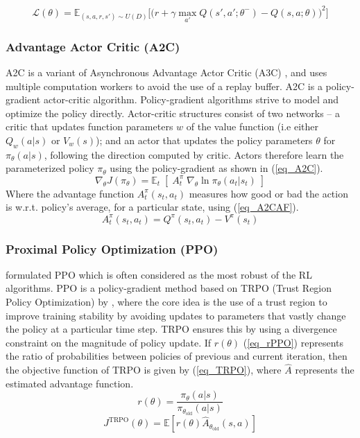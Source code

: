 \documentclass[referee, sn-mathphys-num]{sn-jnl}
\begin{document}
	\begin{equation}\label{eq_DQN}
		\mathcal{L}(\theta) = \mathbb{E}_{(s, a, r, s') \sim U(D)} \Big[ \big( r + \gamma \max_{a'} Q(s', a'; \theta^{-}) - Q(s, a; \theta) \big)^2 \Big]
	\end{equation}
	
	\subsubsection*{Advantage Actor Critic (A2C)}
	
	A2C is a variant of Asynchronous Advantage Actor Critic (A3C) \cite{A2C-mnih2016}, and uses multiple computation workers to avoid the use of a replay buffer. A2C is a policy-gradient actor-critic algorithm. Policy-gradient algorithms strive to model and optimize the policy directly. Actor-critic structures consist of two networks -- a critic that updates function parameters $w$ of the value function (i.e either $Q_w(a \vert s)$ or $V_w(s)$); and an actor that updates the policy parameters $\theta$ for $\pi_\theta(a \vert s)$, following the direction computed by critic. Actors therefore learn the parameterized policy $\pi_{\theta}$ using the policy-gradient as shown in (\ref{eq_A2C}). 
	\begin{equation}\label{eq_A2C}
		\nabla_ \theta J(\pi_\theta) = \mathbb{E}_t \; [ \; A^\pi_t \; \nabla_\theta \ln \pi_\theta(a_t \vert s_t) \;]
	\end{equation}
	Where the advantage function $A^\pi_t (s_t, a_t)$ measures how good or bad the action is w.r.t. policy's average, for a particular state, using (\ref{eq_A2CAF}).
	\begin{equation}\label{eq_A2CAF}
		A^\pi_t (s_t, a_t) = Q^\pi (s_t, a_t) - V^\pi (s_t)
	\end{equation}
	
	\subsubsection*{Proximal Policy Optimization (PPO)} 
	\cite{PPO-schulman2017} formulated PPO which is often considered as the most robust of the RL algorithms. PPO is a policy-gradient method based on TRPO (Trust Region Policy Optimization) by \cite{TRPO-schulman2015}, where the core idea is the use of a trust region to improve training stability by avoiding updates to parameters that vastly change the policy at a particular time step. TRPO ensures this by using a divergence constraint on the magnitude of policy update. If $r(\theta)$ (\ref{eq_rPPO}) represents the ratio of probabilities between policies of previous and current iteration, then the objective function of TRPO is given by (\ref{eq_TRPO}), where $\hat{A}$ represents the estimated advantage function.
	\begin{equation}\label{eq_rPPO}
		r(\theta) = \frac{\pi_\theta(a \vert s)}{\pi_{\theta_\text{old}}(a \vert s)}
	\end{equation}
	\begin{equation}\label{eq_TRPO}
		J^\text{TRPO} (\theta) = \mathbb{E} [ r(\theta) \hat{A}_{\theta_\text{old}}(s, a) ]
	\end{equation}
	
\end{document}
